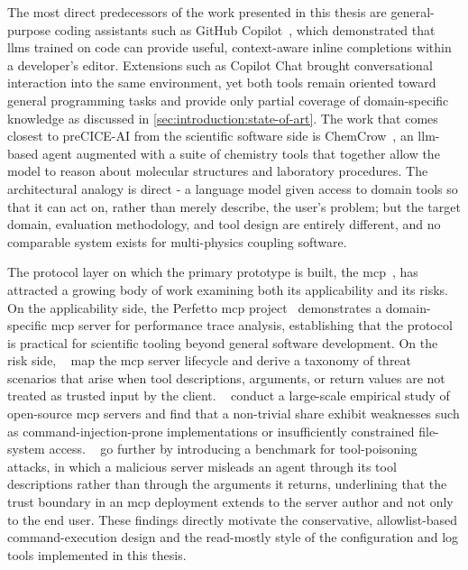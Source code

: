\documentclass[
  numbers=noenddot,
  english,
  a4paper,
  twoside,
  bibliography=totoc,
  headsepline,
  cleardoublepage=empty,
  parskip=half,
  draft=false
]{scrbook}
\theoremstyle{break}
\renewcommand{\_}{\textunderscore\allowbreak}
\begin{document}
The most direct predecessors of the work presented in this thesis are general-purpose coding
assistants such as GitHub Copilot~\cite{chen2021copilot}, which demonstrated that \glspl{llm}
trained on code can provide useful, context-aware inline completions within a developer's
editor.
Extensions such as Copilot Chat brought conversational interaction into the same environment,
yet both tools remain oriented toward general programming tasks and provide only partial
coverage of domain-specific knowledge as discussed in \cref{sec:introduction:state-of-art}.
The work that comes closest to preCICE-AI from the scientific software side is
ChemCrow~\cite{bran2023chemcrow}, an \gls{llm}-based agent augmented with a suite of
chemistry tools that together allow the model to reason about molecular structures and
laboratory procedures.
The architectural analogy is direct - a language model given access to domain tools so that
it can act on, rather than merely describe, the user's problem; but the target domain,
evaluation methodology, and tool design are entirely different, and no comparable system
exists for multi-physics coupling software.

The protocol layer on which the primary prototype is built, the \gls{mcp}~\cite{mcp2024spec},
has attracted a growing body of work examining both its applicability and its risks.
On the applicability side, the Perfetto \gls{mcp} project~\cite{perfettomcp2024} demonstrates
a domain-specific \gls{mcp} server for performance trace analysis, establishing that the
protocol is practical for scientific tooling beyond general software development.
On the risk side, \citeauthor{hou2025mcplandscape}~\cite{hou2025mcplandscape} map the
\gls{mcp} server lifecycle and derive a taxonomy of threat scenarios that arise when tool
descriptions, arguments, or return values are not treated as trusted input by the client.
\citeauthor{hasan2025mcpfirstglance}~\cite{hasan2025mcpfirstglance} conduct a large-scale
empirical study of open-source \gls{mcp} servers and find that a non-trivial share exhibit
weaknesses such as command-injection-prone implementations or insufficiently constrained
file-system access.
\citeauthor{wang2025mcptox}~\cite{wang2025mcptox} go further by introducing a benchmark
for tool-poisoning attacks, in which a malicious server misleads an agent through its tool
descriptions rather than through the arguments it returns, underlining that the trust boundary
in an \gls{mcp} deployment extends to the server author and not only to the end user.
These findings directly motivate the conservative, allowlist-based command-execution design
and the read-mostly style of the configuration and log tools implemented in this thesis.
\end{document}
